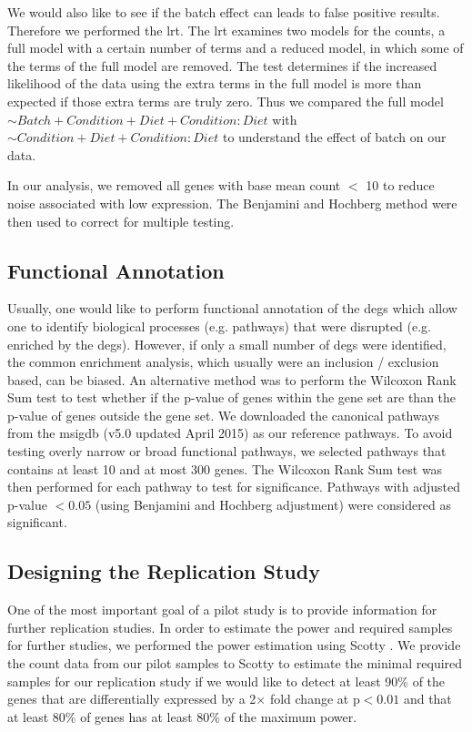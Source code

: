 We would also like to see if the batch effect can leads to false positive results.
Therefore we performed the \gls{lrt}.
The \gls{lrt} examines two models for the counts, a full model with a certain number of terms and a reduced model, in which some of the terms of the full model are removed. 
The test determines if the increased likelihood of the data using the extra terms in the full model is more than expected if those extra terms are truly zero.
Thus we compared the full model $\sim Batch+Condition+Diet+Condition:Diet$ with $\sim Condition+Diet+Condition:Diet$ to understand the effect of batch on our data.

In our analysis, we removed all genes with base mean count $<$ 10  to reduce noise associated with low expression. 
The Benjamini and Hochberg method were then used to correct for multiple testing.

\subsection{Functional Annotation}
Usually, one would like to perform functional annotation of the \glspl{deg} which allow one to identify biological processes (e.g. pathways) that were disrupted (e.g. enriched by the \glspl{deg}).
However, if only a small number of \glspl{deg} were identified, the common enrichment analysis, which usually were an inclusion / exclusion based, can be biased. 
An alternative method was to perform the Wilcoxon Rank Sum test to test whether if the p-value of genes within the gene set are than the p-value of genes outside the gene set.
We downloaded the canonical pathways from the \gls{msigdb} (v5.0 updated April 2015) \citep{Subramanian2005} as our reference pathways.
To avoid testing overly narrow or broad functional pathways, we selected pathways that contains at least 10 and at most 300 genes.
The Wilcoxon Rank Sum test was then performed for each pathway to test for significance.
Pathways with adjusted p-value $<0.05$ (using Benjamini and Hochberg adjustment) were considered as significant.

\subsection{Designing the Replication Study}
One of the most important goal of a pilot study is to provide information for further replication studies. 
In order to estimate the power and required samples for further studies, we performed the power estimation using Scotty \citep{Busby2013}.
We provide the count data from our pilot samples to Scotty to estimate the minimal required samples for our replication study if we would like to detect at least 90\% of the genes that are differentially expressed by a 2$\times$ fold change at p$<0.01$ and that at least 80\% of genes has at least 80\% of the maximum power.

